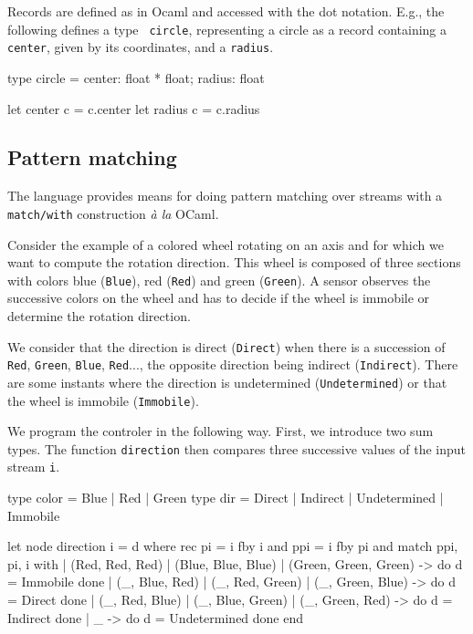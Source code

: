 \documentclass[11pt,titlepage,twoside]{report}
\newcommand{\ocaml}{{\sf OCaml}}
\begin{document}
Records are defined as in Ocaml and accessed with the dot notation. E.g.,
the following defines a type {\tt
  circle}, representing a circle as a record containing a {\tt
  center}, given by its coordinates, and a {\tt radius}.
\begin{runverbatim}
type circle = { center: float * float; radius: float }

let center c = c.center
let radius c = c.radius
\end{runverbatim}
  
\subsection{Pattern matching} %
The language provides means for doing pattern matching over streams
with a \verb-match/with- construction {\em \`a la} \ocaml.

Consider the example of a colored wheel rotating on an axis and for
which we want to compute the rotation direction. This wheel is
composed of three sections with colors blue (\verb-Blue-), red
(\verb-Red-) and green (\verb-Green-).  A sensor observes the
successive colors on the wheel and has to decide if the wheel is
immobile or determine the rotation direction.

We consider that the direction is direct (\verb-Direct-) when there is
a succession of \verb-Red-, \verb-Green-, \verb-Blue-, \verb-Red-...,
the opposite direction being indirect (\verb-Indirect-). There are
some instants where the direction is undetermined
(\verb-Undetermined-) or that the wheel is immobile (\verb-Immobile-).

We program the controler in the following way. First, we introduce two
sum types.  The function \verb-direction- then compares three
successive values of the input stream \verb-i-.
\begin{runverbatim}
type color = Blue | Red | Green
type dir = Direct | Indirect | Undetermined | Immobile
\end{runverbatim}

\begin{runverbatim}
let node direction i = d where
  rec pi = i fby i
  and ppi = i fby pi
  and match ppi, pi, i with
  | (Red, Red, Red) | (Blue, Blue, Blue) | (Green, Green, Green) ->
         do d = Immobile done
  | (_, Blue, Red) | (_, Red, Green) | (_, Green, Blue) -> 
         do d = Direct done
  | (_, Red, Blue) | (_, Blue, Green) | (_, Green, Red) -> 
         do d = Indirect done
  | _ -> do d = Undetermined done
  end
\end{runverbatim}
\end{document}
